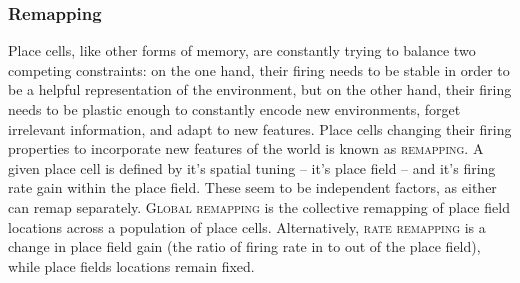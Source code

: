 \subsubsection{Remapping}
\citep{Muller1987}
Place cells, like other forms of memory, are constantly trying to balance two competing constraints: on the one hand, their firing needs to be stable in order to be a helpful representation of the environment, but on the other hand, their firing needs to be plastic enough to constantly encode new environments, forget irrelevant information, and adapt to new features.
Place cells changing their firing properties to incorporate new features of the world is known as \textsc{remapping}.
A given place cell is defined by it's spatial tuning -- it's place field -- and it's firing rate gain within the place field.
These seem to be independent factors, as either can remap separately.
\textsc{Global remapping} is the collective remapping of place field locations across a population of place cells.
Alternatively, \textsc{rate remapping} is a change in place field gain (the ratio of firing rate in to out of the place field), while place fields locations remain fixed.

